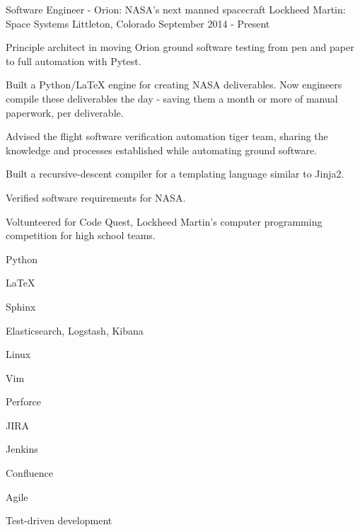 

\begin{cventries}

  \cventry
    {Software Engineer - Orion: NASA's next manned spacecraft} %
    {Lockheed Martin: Space Systems} %
    {Littleton, Colorado} %
    {September 2014 - Present} %
    {%
      \begin{cvitems} %
        \item {Principle architect in moving Orion ground software testing from pen and paper to full automation with Pytest.}
        \item {Built a Python/LaTeX engine for creating NASA deliverables.  Now engineers compile these deliverables the day - saving them a month or more of manual paperwork, per deliverable.}
        \item {Advised the flight software verification automation tiger team, sharing the knowledge and processes established while automating ground software.}
        \item {Built a recursive-descent compiler for a templating language similar to Jinja2.}
        \item {Verified software requirements for NASA.}
        \item {Voltunteered for Code Quest, Lockheed Martin's computer programming competition for high school teams.}
      \end{cvitems}
    }
    \begin{cventryskills}
      \item Python
      \item LaTeX
      \item Sphinx
      \item Elasticsearch, Logstash, Kibana
      \item Linux
      \item Vim
      \item Perforce
      \item JIRA
      \item Jenkins
      \item Confluence
      \item Agile
      \item Test-driven development
    \end{cventryskills}


\end{cventries}
